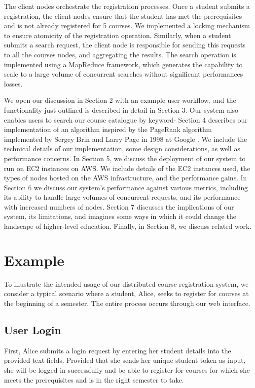 \documentclass[sigplan, screen, 10pt]{acmart}
\begin{document}
The client nodes orchestrate the registration processes. Once a student submits a registration, the client nodes ensure that the student has met the prerequisites and is not already registered for 5 courses. We implemented a locking mechanism to ensure atomicity of the registration operation. Similarly, when a student submits a search request, the client node is responsible for sending this requests to all the courses nodes, and aggregating the results. The search operation is implemented using a MapReduce \cite{mapreduce} framework, which generates the capability to scale to a large volume of concurrent searches without significant performances losses. 

We open our discussion in Section 2 with an example user workflow, and the functionality just outlined is described in detail in Section 3. Our system also enables users to search our course catalogue by keyword- Section 4 describes our implementation of an algorithm inspired by the PageRank algorithm implemented by Sergey Brin and Larry Page in 1998 at Google \cite{google}. We include the technical details of our implementation, some design considerations, as well as performance concerns. In Section 5, we discuss the deployment of our system to run on EC2 instances on AWS. We include details of the EC2 instances used, the types of nodes hosted on the AWS infrastructure, and the performance gains. In Section 6 we discuss our system’s performance against various metrics, including its ability to handle large volumes of concurrent requests, and its performance with increased numbers of nodes. Section 7 discusses the implications of our system, its limitations, and imagines some ways in which it could change the landscape of higher-level education. Finally, in Section 8, we discuss related work.

\section{Example}
\label{bg}

To illustrate the intended usage of our distributed course registration system, we consider a typical scenario where a student, Alice, seeks to register for courses at the beginning of a semester. The entire process occurs through our web interface.
\subsection{User Login}
First, Alice submits a login request by entering her student details into the provided text fields. Provided that she sends her unique student token as input, she will be logged in successfully and be able to register for courses for which she meets the prerequisites and is in the right semester to take.
\end{document}
